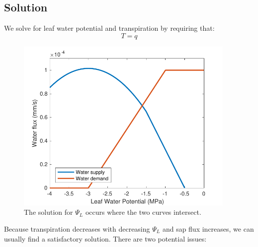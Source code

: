 \documentclass[11pt]{article}
\begin{document}
\clearpage
\subsection{Solution}

We solve for leaf water potential and transpiration by requiring that: 
\begin{equation}
T = q
\end{equation}

\begin{figure}[h]
\centering
\includegraphics[width=25pc]{../figs/spac_solution}
\caption{The solution for $\Psi_L$ occurs where the two curves intersect.}
\label{fig:soln}
\end{figure}

Because transpiration decreases with decreasing $\Psi_L$ and sap flux increases, we can usually find a satisfactory solution. There are two potential issues:
\end{document}
